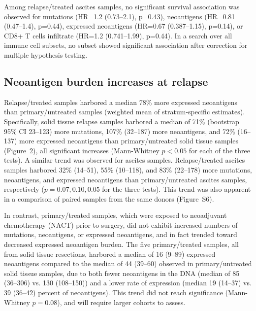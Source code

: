 \documentclass[linenumbers]{bmcart}
\begin{document}
Among relapse/treated ascites samples, no significant survival association was observed for mutations (HR=1.2 (0.73--2.1), p=0.43), neoantigens (HR=0.81 (0.47--1.4), p=0.44), expressed neoantigens (HR=0.67 (0.387--1.15), p=0.14), or CD8+ T cells infiltrate (HR=1.2 (0.741--1.99), p=0.44). In a search over all immune cell subsets, no subset showed significant association after correction for multiple hypothesis testing.


\subsection*{Neoantigen burden increases at relapse}

Relapse/treated samples harbored a median 78\% more expressed neoantigens than primary/untreated samples (weighted mean of stratum-specific estimates). Specifically, solid tissue relapse samples harbored a median of 71\% (bootstrap 95\% CI 23--123) more mutations, 107\% (32--187) more neoantigens, and 72\% (16--137) more expressed neoantigens than primary/untreated solid tissue samples (Figure~2), all significant increases (Mann-Whitney $p < 0.05$ for each of the three tests). A similar trend was observed for ascites samples. Relapse/treated ascites samples harbored 32\% (14--51), 55\% (10--118), and 83\% (22--178) more mutations, neoantigens, and expressed neoantigens than primary/untreated ascites samples, respectively ($p=0.07, 0.10, 0.05$ for the three tests). This trend was also apparent in a comparison of paired samples from the same donors (Figure~S6).

In contrast, primary/treated samples, which were exposed to neoadjuvant chemotherapy (NACT) prior to surgery, did not exhibit increased numbers of mutations, neoantigens, or expressed neoantigens, and in fact trended toward decreased expressed neoantigen burden. The five primary/treated samples, all from solid tissue resections, harbored a median of 16 (9--89) expressed neoantigens compared to the median of 44 (39--60) observed in primary/untreated solid tissue samples, due to both fewer neoantigens in the DNA (median of 85 (36--306) vs. 130 (108--150)) and a lower rate of expression (median 19 (14--37) vs. 39 (36--42) percent of neoantigens). This trend did not reach significance (Mann-Whitney $p=0.08$), and will require larger cohorts to assess.
\end{document}
